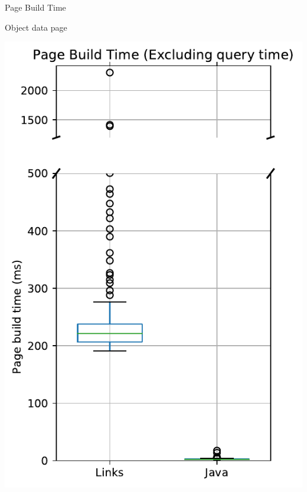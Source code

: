 \documentclass[11.5pt, aspectratio=169]{beamer}
\begin{document}
\begin{frame}{Page Build Time}
\begin{minipage}[t]{0.45\textwidth}
    \begin{center}
      Object data page
    \end{center}
  \end{minipage}
  \hfill
  \begin{minipage}[t]{0.45\textwidth}
    \centering
    \includegraphics[scale=0.3]{images/diseasedisplay_pagebuild_excl_box.pdf}
    ~

\end{minipage}
\end{frame}
\end{document}
